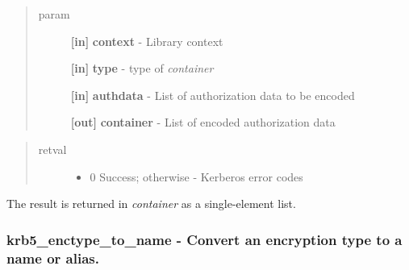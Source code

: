 \documentclass[letterpaper,10pt,english]{sphinxmanual}
\begin{document}
\begin{quote}\begin{description}
\item[{param}] \leavevmode
\textbf{{[}in{]}} \textbf{context} - Library context

\textbf{{[}in{]}} \textbf{type} -  type of \emph{container}

\textbf{{[}in{]}} \textbf{authdata} - List of authorization data to be encoded

\textbf{{[}out{]}} \textbf{container} - List of encoded authorization data

\end{description}\end{quote}
\begin{quote}\begin{description}
\item[{retval}] \leavevmode\begin{itemize}
\item {} 
0   Success; otherwise - Kerberos error codes

\end{itemize}

\end{description}\end{quote}

The result is returned in \emph{container} as a single-element list.




{\hyperref[appdev/refs/api/krb5_decode_authdata_container:krb5_decode_authdata_container]{}}




\subsubsection{krb5\_enctype\_to\_name -  Convert an encryption type to a name or alias.}
\label{appdev/refs/api/krb5_enctype_to_name::doc}\label{appdev/refs/api/krb5_enctype_to_name:krb5-enctype-to-name-convert-an-encryption-type-to-a-name-or-alias}

\begin{fulllineitems}
\label{appdev/refs/api/krb5_enctype_to_name:krb5_enctype_to_name}
\end{fulllineitems}
\end{document}
